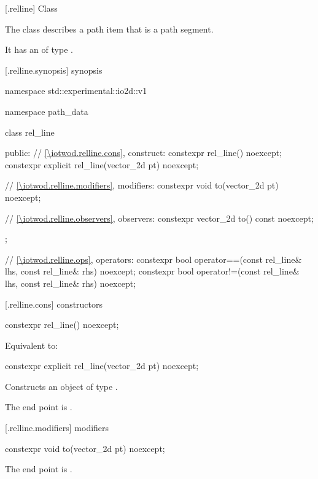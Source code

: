  [\iotwod.relline] {Class }

\pnum
{}%
The class  describes a path item that is a path segment.

\pnum
It has an  of type .

 [\iotwod.relline.synopsis] { synopsis}

\begin{codeblock}
namespace std::experimental::io2d::v1 {
  namespace path_data {
    class rel_line {
    public:
      // \ref{\iotwod.relline.cons}, construct:
      constexpr rel_line() noexcept;
      constexpr explicit rel_line(vector_2d pt) noexcept;

      // \ref{\iotwod.relline.modifiers}, modifiers:
      constexpr void to(vector_2d pt) noexcept;

      // \ref{\iotwod.relline.observers}, observers:
      constexpr vector_2d to() const noexcept;
    };
    
    // \ref{\iotwod.relline.ops}, operators:
    constexpr bool operator==(const rel_line& lhs, const rel_line& rhs) 
      noexcept;
    constexpr bool operator!=(const rel_line& lhs, const rel_line& rhs) 
      noexcept;
  }
}
\end{codeblock}

 [\iotwod.relline.cons] { constructors}

%
\begin{itemdecl}
constexpr rel_line() noexcept;
\end{itemdecl}
\begin{itemdescr}
\pnum
\effects
Equivalent to: 
\end{itemdescr}

%
\begin{itemdecl}
constexpr explicit rel_line(vector_2d pt) noexcept;
\end{itemdecl}
\begin{itemdescr}
\pnum
\effects
Constructs an object of type .

\pnum
The end point is .
\end{itemdescr}

 [\iotwod.relline.modifiers]{ modifiers}

\begin{itemdecl}
constexpr void to(vector_2d pt) noexcept;
\end{itemdecl}
\begin{itemdescr}
\pnum
\effects
The end point is .
\end{itemdescr}

